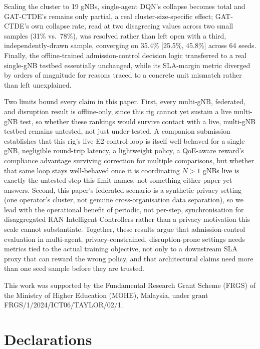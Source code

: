 \documentclass[pdflatex,sn-basic,Numbered]{sn-jnl}%
\begin{document}
Scaling the cluster to 19 gNBs, single-agent DQN's collapse becomes
total and GAT-CTDE's remains only partial, a real cluster-size-specific
effect; GAT-CTDE's own collapse rate, read at two disagreeing values
across two small samples (31\% vs.\ 78\%), was resolved rather than
left open with a third, independently-drawn sample, converging on
35.4\% [25.5\%, 45.8\%] across 64 seeds. Finally, the offline-trained
admission-control decision logic transferred to a real single-gNB
testbed essentially unchanged, while its SLA-margin metric diverged by
orders of magnitude for reasons traced to a concrete unit mismatch
rather than left unexplained.

Two limits bound every claim in this paper. First, every multi-gNB, federated, and disruption result is offline-only, since this rig cannot yet sustain a live multi-gNB test, so whether these rankings would survive contact with a live, multi-gNB testbed remains untested, not just under-tested. A companion submission~\cite{cacs26-paper} establishes that this rig's live E2 control loop is itself well-behaved for a single gNB, negligible round-trip latency, a lightweight policy, a QoE-aware reward's compliance advantage surviving correction for multiple comparisons, but whether that same loop stays well-behaved once it is coordinating $N>1$ gNBs live is exactly the untested step this limit names, not something either paper yet answers.
Second, this paper's federated scenario is a synthetic privacy setting (one operator's cluster, not genuine cross-organisation data separation), so we lead with the operational benefit of periodic, not per-step, synchronisation for disaggregated RAN Intelligent Controllers rather than a privacy motivation this scale cannot substantiate. Together, these results argue that admission-control
evaluation in multi-agent, privacy-constrained, disruption-prone
settings needs metrics tied to the actual training objective, not only
to a downstream SLA proxy that can reward the wrong policy, and that
architectural claims need more than one seed sample before they are
trusted.

\backmatter

This work was supported by the Fundamental Research Grant Scheme
(FRGS) of the Ministry of Higher Education (MOHE), Malaysia, under
grant FRGS/1/2024/ICT06/TAYLOR/02/1.

\section*{Declarations}
\end{document}

